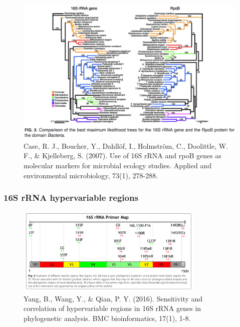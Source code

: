 \documentclass[
]{book}
\begin{document}
\begin{figure}
\centering
\includegraphics[width=1\textwidth,height=\textheight]{./Figures/RpoB.png}
\caption{Case, R. J., Boucher, Y., Dahllöf, I., Holmström, C., Doolittle, W. F., \& Kjelleberg, S. (2007). Use of 16S rRNA and rpoB genes as molecular markers for microbial ecology studies. Applied and environmental microbiology, 73(1), 278-288.}
\end{figure}

\hypertarget{s-rrna-hypervariable-regions}{%
\subsubsection{16S rRNA hypervariable regions}\label{s-rrna-hypervariable-regions}}

\begin{figure}
\centering
\includegraphics[width=0.8\textwidth,height=\textheight]{./Figures/Hypervariable1.png}
\caption{Yang, B., Wang, Y., \& Qian, P. Y. (2016). Sensitivity and correlation of hypervariable regions in 16S rRNA genes in phylogenetic analysis. BMC bioinformatics, 17(1), 1-8.}
\end{figure}
\end{document}
